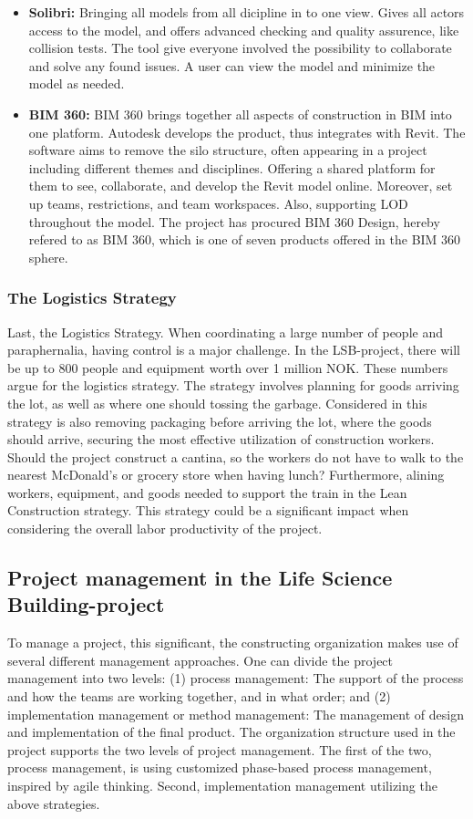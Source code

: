 \begin{itemize}
    \item { \bf Solibri:} Bringing all models from all dicipline in to one view. Gives all actors access to the model, and offers advanced checking and quality assurence, like collision tests. The tool give everyone involved the possibility to collaborate and solve any found issues. A user can view the model and minimize the model as needed. 
    \item { \bf BIM 360:} BIM 360 brings together all aspects of construction in BIM into one platform. Autodesk develops the product, thus integrates with Revit. The software aims to remove the silo structure, often appearing in a project including different themes and disciplines. Offering a shared platform for them to see, collaborate, and develop the Revit model online. Moreover, set up teams, restrictions, and team workspaces. Also, supporting LOD throughout the model. The project has procured BIM 360 Design, hereby refered to as BIM 360, which is one of seven products offered in the BIM 360 sphere.
   \end{itemize}

\subsubsection*{The Logistics Strategy}
Last, the Logistics Strategy. When coordinating a large number of people and paraphernalia, having control is a major challenge. In the LSB-project, there will be up to 800 people and equipment worth over 1 million NOK.  These numbers argue for the logistics strategy. The strategy involves planning for goods arriving the lot, as well as where one should tossing the garbage. Considered in this strategy is also removing packaging before arriving the lot, where the goods should arrive, securing the most effective utilization of construction workers. Should the project construct a cantina, so the workers do not have to walk to the nearest McDonald's or grocery store when having lunch? Furthermore, alining workers, equipment, and goods needed to support the train in the Lean Construction strategy. This strategy could be a significant impact when considering the overall labor productivity of the project. 


\subsection{Project management in the Life Science Building-project}
To manage a project, this significant, the constructing organization makes use of several different management approaches. One can divide the project management into two levels: (1) process management: The support of the process and how the teams are working together, and in what order; and (2) implementation management or method management: The management of design and implementation of the final product. The organization structure used in the project supports the two levels of project management. The first of the two, process management, is using customized phase-based process management, inspired by agile thinking. Second, implementation management utilizing the above strategies. 

